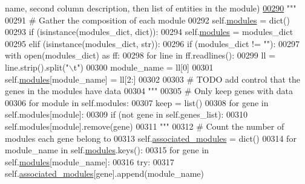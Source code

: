 \begin{DoxyCode}
{      name, second column description, then list of entities in the module)}
\hypertarget{navicom_8py_source_l00290}{}\hyperlink{classnavicom_1_1navicom_1_1NaviCom_a6411b52971f15bd11270942cb98eaa1a}{00290} \textcolor{stringliteral}{        """}
00291         \textcolor{comment}{# Gather the composition of each module}
00292         self.\hyperlink{classnavicom_1_1navicom_1_1NaviCom_a56141660ddf29a36a8291e938246578c}{modules} = dict()
00293         \textcolor{keywordflow}{if} (isinstance(modules\_dict, dict)):
00294             self.\hyperlink{classnavicom_1_1navicom_1_1NaviCom_a56141660ddf29a36a8291e938246578c}{modules} = modules\_dict 
00295         \textcolor{keywordflow}{elif} (isinstance(modules\_dict, str)):
00296             \textcolor{keywordflow}{if} (modules\_dict != \textcolor{stringliteral}{""}):
00297                 with open(modules\_dict) \textcolor{keyword}{as} ff:
00298                     \textcolor{keywordflow}{for} line \textcolor{keywordflow}{in} ff.readlines():
00299                         ll = line.strip().split(\textcolor{stringliteral}{"\(\backslash\)t"})
00300                         module\_name = ll[0]
00301                         self.\hyperlink{classnavicom_1_1navicom_1_1NaviCom_a56141660ddf29a36a8291e938246578c}{modules}[module\_name] = ll[2:]
00302 
00303         \textcolor{comment}{# TODO add control that the genes in the modules have data}
00304         \textcolor{stringliteral}{"""}
00305 \textcolor{stringliteral}{        # Only keep genes with data}
00306 \textcolor{stringliteral}{        for module in self.modules:}
00307 \textcolor{stringliteral}{            keep = list()}
00308 \textcolor{stringliteral}{            for gene in self.modules[module]:}
00309 \textcolor{stringliteral}{                if (not gene in self.genes\_list):}
00310 \textcolor{stringliteral}{                    self.modules[module].remove(gene)}
00311 \textcolor{stringliteral}{        """}
00312         \textcolor{comment}{# Count the number of modules each gene belong to}
00313         self.\hyperlink{classnavicom_1_1navicom_1_1NaviCom_a9f3e4dbfabe319967c14bf61eaf8d022}{associated_modules} = dict()
00314         \textcolor{keywordflow}{for} module\_name \textcolor{keywordflow}{in} self.\hyperlink{classnavicom_1_1navicom_1_1NaviCom_a56141660ddf29a36a8291e938246578c}{modules}.keys():
00315             \textcolor{keywordflow}{for} gene \textcolor{keywordflow}{in} self.\hyperlink{classnavicom_1_1navicom_1_1NaviCom_a56141660ddf29a36a8291e938246578c}{modules}[module\_name]:
00316                 \textcolor{keywordflow}{try}:
00317                     self.\hyperlink{classnavicom_1_1navicom_1_1NaviCom_a9f3e4dbfabe319967c14bf61eaf8d022}{associated_modules}[gene].append(module\_name)

\end{DoxyCode}
